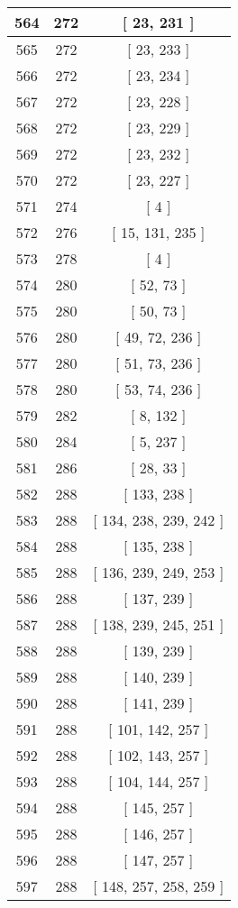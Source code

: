 \begin{center}
\begin{longtable}[H]{|| c c c ||}
564 & 272 & [ 23, 231 ] \\ 
\hline
565 & 272 & [ 23, 233 ] \\ 
\hline
566 & 272 & [ 23, 234 ] \\ 
\hline
567 & 272 & [ 23, 228 ] \\ 
\hline
568 & 272 & [ 23, 229 ] \\ 
\hline
569 & 272 & [ 23, 232 ] \\ 
\hline
570 & 272 & [ 23, 227 ] \\ 
\hline
571 & 274 & [ 4 ] \\ 
\hline
572 & 276 & [ 15, 131, 235 ] \\ 
\hline
573 & 278 & [ 4 ] \\ 
\hline
574 & 280 & [ 52, 73 ] \\ 
\hline
575 & 280 & [ 50, 73 ] \\ 
\hline
576 & 280 & [ 49, 72, 236 ] \\ 
\hline
577 & 280 & [ 51, 73, 236 ] \\ 
\hline
578 & 280 & [ 53, 74, 236 ] \\ 
\hline
579 & 282 & [ 8, 132 ] \\ 
\hline
580 & 284 & [ 5, 237 ] \\ 
\hline
581 & 286 & [ 28, 33 ] \\ 
\hline
582 & 288 & [ 133, 238 ] \\ 
\hline
583 & 288 & [ 134, 238, 239, 242 ] \\ 
\hline
584 & 288 & [ 135, 238 ] \\ 
\hline
585 & 288 & [ 136, 239, 249, 253 ] \\ 
\hline
586 & 288 & [ 137, 239 ] \\ 
\hline
587 & 288 & [ 138, 239, 245, 251 ] \\ 
\hline
588 & 288 & [ 139, 239 ] \\ 
\hline
589 & 288 & [ 140, 239 ] \\ 
\hline
590 & 288 & [ 141, 239 ] \\ 
\hline
591 & 288 & [ 101, 142, 257 ] \\ 
\hline
592 & 288 & [ 102, 143, 257 ] \\ 
\hline
593 & 288 & [ 104, 144, 257 ] \\ 
\hline
594 & 288 & [ 145, 257 ] \\ 
\hline
595 & 288 & [ 146, 257 ] \\ 
\hline
596 & 288 & [ 147, 257 ] \\ 
\hline
597 & 288 & [ 148, 257, 258, 259 ] \\ 

\end{longtable}
\end{center}
